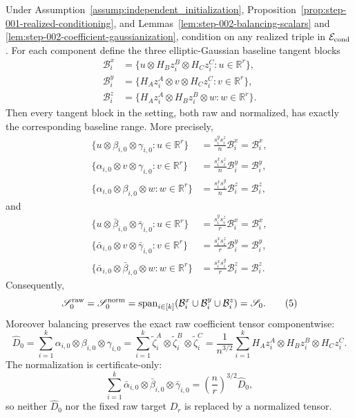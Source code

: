 \begin{proposition}
\label{prop:step-002-balancing-invariance}
Under Assumption~\ref{assump:independent_initialization}, Proposition~\ref{prop:step-001-realized-conditioning}, and
Lemmas~\ref{lem:step-002-balancing-scalars} and
\ref{lem:step-002-coefficient-gaussianization}, condition on any realized
triple in \(\mathcal E_{\rm cond}\). For each component define the three
elliptic-Gaussian baseline tangent blocks
\[
  \begin{aligned}
  \mathcal B_i^x
  &=\{u\otimes H_Bz_i^B\otimes H_Cz_i^C:u\in\mathbb R^r\},\\
  \mathcal B_i^y
  &=\{H_Az_i^A\otimes v\otimes H_Cz_i^C:v\in\mathbb R^r\},\\
  \mathcal B_i^z
  &=\{H_Az_i^A\otimes H_Bz_i^B\otimes w:w\in\mathbb R^r\}.
  \end{aligned}
\]
Then every tangent block in the setting, both raw and normalized, has exactly
the corresponding baseline range. More precisely,
\[
  \begin{aligned}
  \{u\otimes\beta_{i,0}\otimes\gamma_{i,0}:u\in\mathbb R^r\}
    &=\frac{s_i^ys_i^z}{n}\mathcal B_i^x=\mathcal B_i^x,\\
  \{\alpha_{i,0}\otimes v\otimes\gamma_{i,0}:v\in\mathbb R^r\}
    &=\frac{s_i^xs_i^z}{n}\mathcal B_i^y=\mathcal B_i^y,\\
  \{\alpha_{i,0}\otimes\beta_{i,0}\otimes w:w\in\mathbb R^r\}
    &=\frac{s_i^xs_i^y}{n}\mathcal B_i^z=\mathcal B_i^z,
  \end{aligned}                                             \tag{3}
\]
and
\[
  \begin{aligned}
  \{u\otimes\bar\beta_{i,0}\otimes\bar\gamma_{i,0}:u\in\mathbb R^r\}
    &=\frac{s_i^ys_i^z}{r}\mathcal B_i^x=\mathcal B_i^x,\\
  \{\bar\alpha_{i,0}\otimes v\otimes\bar\gamma_{i,0}:v\in\mathbb R^r\}
    &=\frac{s_i^xs_i^z}{r}\mathcal B_i^y=\mathcal B_i^y,\\
  \{\bar\alpha_{i,0}\otimes\bar\beta_{i,0}\otimes w:w\in\mathbb R^r\}
    &=\frac{s_i^xs_i^y}{r}\mathcal B_i^z=\mathcal B_i^z.
  \end{aligned}                                             \tag{4}
\]
Consequently,
\[
  \mathscr S_0^{\rm raw}=\mathscr S_0^{\rm norm}
  =\operatorname{span}_{i\in[k]}
    (\mathcal B_i^x\cup\mathcal B_i^y\cup\mathcal B_i^z)
  =\mathscr S_0.                                            \tag{5}
\]
Moreover balancing preserves the exact raw coefficient tensor componentwise:
\[
  \widehat D_0
  =\sum_{i=1}^k\alpha_{i,0}\otimes\beta_{i,0}\otimes\gamma_{i,0}
  =\sum_{i=1}^k\widetilde\zeta_i^A\otimes
                    \widetilde\zeta_i^B\otimes
                    \widetilde\zeta_i^C
  =\frac1{n^{3/2}}\sum_{i=1}^k
       H_Az_i^A\otimes H_Bz_i^B\otimes H_Cz_i^C.           \tag{6}
\]
The normalization is certificate-only:
\[
  \sum_{i=1}^k\bar\alpha_{i,0}\otimes\bar\beta_{i,0}
                    \otimes\bar\gamma_{i,0}
  =\left(\frac nr\right)^{3/2}\widehat D_0,                \tag{7}
\]
so neither \(\widehat D_0\) nor the fixed raw target \(D_r\) is replaced by a
normalized tensor.

\end{proposition}

